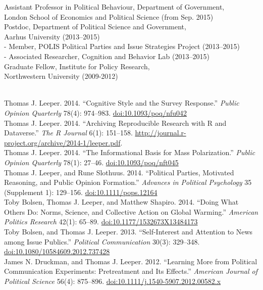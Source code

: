 \documentclass[12pt]{article}
\renewcommand{\section}[1]{\pagebreak[3]%
    \llap{\scshape\smash{\parbox[t]{\marginparwidth}{\raggedright {\color{lg}#1}}}}%
    \vspace{-\baselineskip}\par}
\newcommand{\topic}[1]{\pagebreak[3]\indent {\color{lg}{\footnotesize #1 }}\\}
\newcommand{\entry}[1]{\indent {\color{lg}\guillemotright}\hspace{2pt}#1\vspace{.25em}\\}
\newcommand{\subentry}[1]{{\color{lg}-} #1\vspace{.25em}\\}
\begin{document}
\section{Academic Appointments}
\entry{Assistant Professor in Political Behaviour, Department of Government,\\ London School of Economics and Political Science (from Sep. 2015)}
\entry{Postdoc, Department of Political Science and Government,\\ Aarhus University (2013--2015)}
\subentry{Member, POLIS Political Parties and Issue Strategies Project (2013--2015)}
\subentry{Associated Researcher, Cognition and Behavior Lab (2013--2015)}
\entry{Graduate Fellow, Institute for Policy Research,\\ Northwestern University (2009-2012)}

\section{Publications}
\topic{Peer-Reviewed Publications}
\entry{Thomas J. Leeper. 2014. ``Cognitive Style and the Survey Response.'' {\em Public Opinion Quarterly} 78(4): 974--983. \href{http://dx.doi.org/10.1093/poq/nfu042}{doi:10.1093/poq/nfu042}}
\entry{Thomas J. Leeper. 2014. ``Archiving Reproducible Research with R and Dataverse.'' {\em The R Journal} 6(1): 151--158. \href{http://journal.r-project.org/archive/2014-1/leeper.pdf}{http://journal.r-project.org/archive/2014-1/leeper.pdf}.}
\entry{Thomas J. Leeper. 2014. ``The Informational Basis for Mass Polarization.'' {\em Public Opinion Quarterly} 78(1): 27--46. \href{http://dx.doi.org/10.1093/poq/nft045}{doi:10.1093/poq/nft045}}
\entry{Thomas J. Leeper, and Rune Slothuus. 2014. ``Political Parties, Motivated Reasoning, and Public Opinion Formation.'' {\em Advances in Political Psychology} 35 (Supplement 1): 129--156. \href{http://dx.doi.org/10.1111/pops.12164}{doi:10.1111/pops.12164}}
\entry{Toby Bolsen, Thomas J. Leeper, and Matthew Shapiro. 2014. ``Doing What Others Do: Norms, Science, and Collective Action on Global Warming.'' {\em American Politics Research} 42(1): 65--89. \href{http://dx.doi.org/10.1177/1532673X13484173}{doi:10.1177/1532673X13484173}}
\entry{Toby Bolsen, and Thomas J. Leeper. 2013. ``Self-Interest and Attention to News among Issue Publics.'' {\em Political Communication} 30(3): 329--348.\\ \href{http://dx.doi.org/10.1080/10584609.2012.737428}{doi:10.1080/10584609.2012.737428}}
\entry{James N. Druckman, and Thomas J. Leeper. 2012. ``Learning More from Political Communication Experiments: Pretreatment and Its Effects.'' {\em American Journal of Political Science} 56(4): 875--896. \href{http://dx.doi.org/10.1111/j.1540-5907.2012.00582.x}{doi:10.1111/j.1540-5907.2012.00582.x}}
\end{document}
